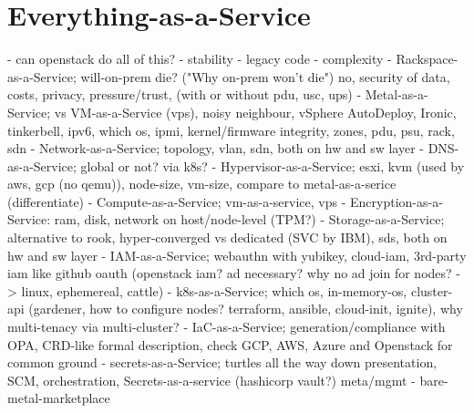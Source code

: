 
\section{Everything-as-a-Service}
- can openstack do all of this?
  - stability
  - legacy code
  - complexity
- Rackspace-as-a-Service; will-on-prem die? ("Why on-prem won't die") no, security of data, costs, privacy, pressure/trust, (with or without pdu, usc, ups)
- Metal-as-a-Service; vs VM-as-a-Service (vps), noisy neighbour, vSphere AutoDeploy, Ironic, tinkerbell, ipv6, which os, ipmi, kernel/firmware integrity, zones, pdu, psu, rack, sdn
- Network-as-a-Service; topology, vlan, sdn, both on hw and sw layer
- DNS-as-a-Service; global or not? via k8s?
- Hypervisor-as-a-Service; esxi, kvm (used by aws, gcp (no qemu)), node-size, vm-size, compare to metal-as-a-serice (differentiate)
- Compute-as-a-Service; vm-as-a-service, vps
- Encryption-as-a-Service: ram, disk, network on host/node-level (TPM?)
- Storage-as-a-Service; alternative to rook, hyper-converged vs dedicated (SVC by IBM), sds, both on hw and sw layer
- IAM-as-a-Service; webauthn with yubikey, cloud-iam, 3rd-party iam like github oauth (openstack iam? ad necessary? why no ad join for nodes? -> linux, ephemereal, cattle)
- k8s-as-a-Service; which os, in-memory-os, cluster-api (gardener, how to configure nodes? terraform, ansible, cloud-init, ignite), why multi-tenacy via multi-cluster?
- IaC-as-a-Service; generation/compliance with OPA, CRD-like formal description, check GCP, AWS, Azure and Openstack for common ground
- secrets-as-a-Service; turtles all the way down presentation, SCM, orchestration, Secrets-as-a-service (hashicorp vault?)
meta/mgmt
- bare-metal-marketplace

